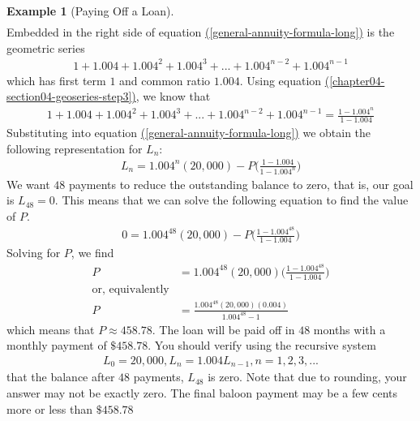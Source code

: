 \documentclass[10pt,]{book}
\theoremstyle{plain}
\theoremstyle{definition}
\theoremstyle{definition}
\newtheorem{example}[theorem]{Example}
\theoremstyle{definition}
\numberwithin{equation}{section}
\begin{document}
\begin{example}[Paying Off a Loan]
\begin{gather}
\end{gather}
\hypertarget{p-163}{}%
Embedded in the right side of equation \hyperref[general-annuity-formula-long]{(\ref{general-annuity-formula-long})} is the geometric series%
%
\begin{gather*}
1 + 1.004 + 1.004^2 + 1.004^3 + ... + 1.004^{n-2} + 1.004^{n-1}
\end{gather*}
\hypertarget{p-164}{}%
which has first term \(1\) and common ratio \(1.004\). Using equation \hyperref[chapter04-section04-geoseries-step3]{(\ref{chapter04-section04-geoseries-step3})}, we know that%
%
\begin{gather*}
1 + 1.004 + 1.004^2 + 1.004^3 + ... + 1.004^{n-2} + 1.004^{n-1} = \frac{1-1.004^n}{1-1.004}
\end{gather*}
\hypertarget{p-165}{}%
Substituting into equation \hyperref[general-annuity-formula-long]{(\ref{general-annuity-formula-long})} we obtain the following representation for  \(L_n\):%
%
\begin{gather}
L_n = 1.004^n (20,000) - P\bigg(\frac{1-1.004}{1-1.004^n}\bigg)\label{general-annuity-formula-condensed}
\end{gather}
\hypertarget{p-166}{}%
We want \(48\) payments to reduce the outstanding balance to zero, that is, our goal is  \(L_{48}=0\). This means that we can solve the following equation to find the value of \(P\).%
%
\begin{gather*}
0 = 1.004^{48}(20,000)-P\bigg(\frac{1-1.004^{48}}{1-1.004}\bigg)
\end{gather*}
\hypertarget{p-167}{}%
Solving for \(P\), we find%
%
\begin{align*}
P &= 1.004^{48}(20,000)\bigg(\frac{1-1.004^{48}}{1-1.004}\bigg)\\
\text{or, equivalently}\\
P&=\frac{1.004^{48}(20,000)(0.004)}{1.004^{48}-1}
\end{align*}
\hypertarget{p-168}{}%
which means that \(P \approx 458.78\). The loan will be paid off in \(48\) months with a monthly payment of \(\$458.78\). You should verify using the recursive system%
%
\begin{gather*}
L_0 = 20,000, L_n = 1.004L_{n-1}, n = 1, 2, 3, ...
\end{gather*}
\hypertarget{p-169}{}%
that the balance after \(48\) payments, \(L_{48}\) is zero. Note that due to rounding, your answer may not be exactly zero. The final baloon payment may be a few cents more or less than \(\$458.78\)%
\par
\hypertarget{p-170}{}%

\end{example}
\end{document}

